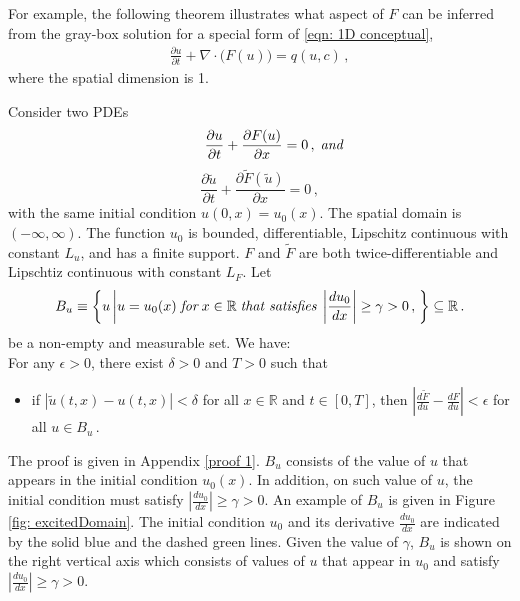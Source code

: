 For example, the following theorem illustrates what aspect of $F$ can be inferred from the gray-box
solution for a special form of \eqref{eqn: 1D conceptual},
\begin{equation*}\begin{split}
    \frac{\partial u}{\partial t}+ \nabla \cdot \big( F(u) \big) = q(u,c)\,,
\end{split}
\end{equation*}
where the spatial dimension is 1.
\begin{theorem}
    Consider two PDEs
    \begin{equation}
        \qquad\frac{\partial u}{\partial t} + \frac{\partial F(u)}{\partial x} = 0\,,\; \emph{and}
        \label{eqn: easy 1}
    \end{equation}
    \begin{equation}
        \frac{\partial \tilde{u}}{\partial t} + \frac{\partial \tilde{F}(\tilde{u})}{\partial x} = 0\,,
        \label{eqn: easy 2}
    \end{equation}
    with the same initial condition $u(0,x) = u_0(x)$. The spatial domain is $(-\infty, \infty)$. 
    The function $u_0$ is bounded, differentiable, 
    Lipschitz continuous with constant $L_u$, 
    and has a finite support. $F$ and $\tilde{F}$ are both twice-differentiable and Lipschtiz 
    continuous with constant $L_F$.
    Let 
    $$
    B_u \equiv \left\{ u\left| u=u_0(x) \; \emph{for}
    \; x \in \mathbb{R} \; \emph{that satisfies}\; \left|\frac{du_0}{dx}\right|\ge \gamma > 0
    \,,\right.
    \right\}
    \subseteq \mathbb{R}\,.
    $$
    be a non-empty and measurable set.
    We have:\\
    For any $\epsilon >0$, there exist $\delta>0$ and $T>0$ such that 
    \begin{itemize}
        \item if $|\tilde{u}(t,x)-u(t,x)| < \delta$ for all $x\in \mathbb{R}$ and $t\in [0,T]$, then
              $\left|\frac{d\tilde{F}}{du} - \frac{dF}{du}\right| < 
               \epsilon $ for all $u\in B_u\,.$
    \end{itemize}
    \label{theorem: 1}
\end{theorem}
The proof is given in Appendix \ref{proof 1}. $B_u$ consists of the value of $u$ that 
appears in the initial condition $u_0(x)$. In addition, on such value of $u$, the 
initial condition must satisfy $\left|\frac{du_0}{dx}\right|\ge \gamma > 0$.
An example of $B_u$ is given in Figure \ref{fig: excitedDomain}.
The initial condition $u_0$ and its derivative $\frac{du_0}{dx}$ are indicated by the
solid blue and the dashed green lines. Given the value of $\gamma$, 
$B_u$ is shown on the right vertical axis which consists of values of $u$ that appear in $u_0$
and satisfy $\left|\frac{du_0}{dx}\right|\ge \gamma > 0$.\\

